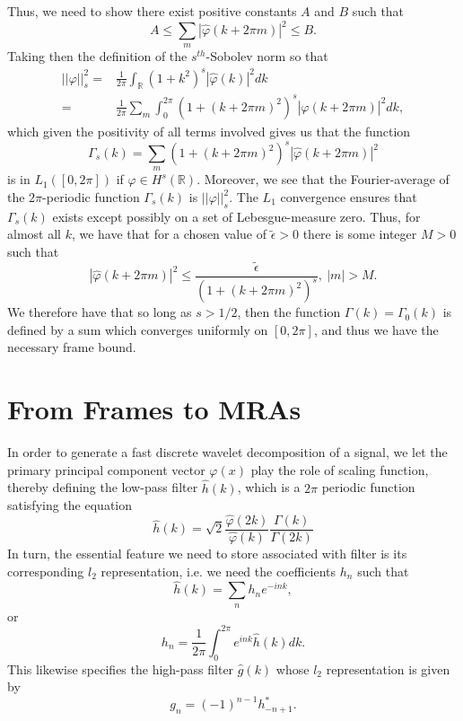 \documentclass[a4paper,11pt]{article}
\newcommand{\gnorm}[1]{\left|\left| #1\right|\right|}
\begin{document}
Thus, we need to show there exist positive constants $A$ and $B$ such that 
\[
A \leq \sum_{m} \left|\hat{\varphi}(k + 2\pi m) \right|^{2} \leq B. 
\]
Taking then the definition of the $s^{th}$-Sobolev norm so that 
\begin{align*}
\gnorm{\varphi}^{2}_{s} = & \frac{1}{2\pi}\int_{\mathbb{R}}\left(1+k^{2}\right)^{s}\left|\hat{\varphi}(k)\right|^{2}dk\\
= & \frac{1}{2\pi}\sum_{m}\int_{0}^{2\pi} \left(1 + (k+2\pi m)^{2} \right)^{s}\left|\hat{\varphi}(k+2\pi m) \right|^{2}dk,
\end{align*}
which given the positivity of all terms involved gives us that the function 
\[
\Gamma_{s}(k) = \sum_{m}\left(1 + (k+2\pi m)^{2} \right)^{s}\left|\hat{\varphi}(k+2\pi m) \right|^{2}
\]
is in $L_{1}([0,2\pi])$ if $\varphi \in H^{s}(\mathbb{R})$.  Moreover, we see that the Fourier-average of the $2\pi$-periodic function $\Gamma_{s}(k)$ is $\gnorm{\varphi}_{s}^{2}$.   The $L_{1}$ convergence ensures that $\Gamma_{s}(k)$ exists except possibly on a set of Lebesgue-measure zero.  Thus, for almost all $k$, we have that for a chosen value of $\tilde{\epsilon}>0$ there is some integer $M>0$ such that 
\[
\left|\hat{\varphi}(k+2\pi m) \right|^{2} \leq \frac{\tilde{\epsilon}}{\left(1+(k+2\pi m)^{2}\right)^{s}}, ~ |m|>M.
\]
We therefore have that so long as $s>1/2$, then the function $\Gamma(k) = \Gamma_{0}(k)$ is defined by a sum which converges uniformly on $[0,2\pi]$, and thus we have the necessary frame bound.  

\section*{From Frames to MRAs}
In order to generate a fast discrete wavelet decomposition of a signal, we let the primary principal component vector $\varphi(x)$ play the role of scaling function, thereby defining the low-pass filter $\hat{h}(k)$, which is a $2\pi$ periodic function satisfying the equation 
\[
\hat{h}(k) = \sqrt{2}\frac{\hat{\varphi}(2k)}{\hat{\varphi}(k)}\frac{\Gamma(k)}{\Gamma(2k)}
\]
In turn, the essential feature we need to store associated with filter is its corresponding $l_{2}$ representation, i.e. we need the coefficients $h_{n}$ such that 
\[
\hat{h}(k) = \sum_{n} h_{n} e^{-ink},
\]
or
\[
h_{n} = \frac{1}{2\pi}\int_{0}^{2\pi}e^{ink}\hat{h}(k)dk.
\]
This likewise specifies the high-pass filter $\hat{g}(k)$ whose $l_{2}$ representation is given by 
\[
g_{n} = (-1)^{n-1}h^{\ast}_{-n+1}.
\]
\end{document}
